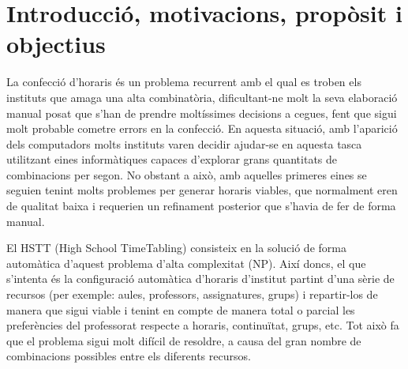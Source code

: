 \documentclass[11pt,a4paper,twoside]{report}
\begin{document}
  \begin{titlepage}
    
  \end{titlepage}


  \shipout\null
  \tableofcontents
  
  \chapter{Introducció, motivacions, propòsit i objectius}
  

  La confecció d'horaris és un problema recurrent amb el qual es troben els instituts que amaga una alta combinatòria, dificultant-ne molt la seva elaboració manual posat que s'han de prendre moltíssimes decisions a cegues,
  fent que sigui molt probable cometre errors en la confecció. En aquesta situació, amb l'aparició dels computadors molts instituts varen decidir ajudar-se en aquesta tasca utilitzant eines informàtiques capaces 
  d'explorar grans quantitats de combinacions per segon. No obstant a això, amb aquelles primeres eines se seguien tenint molts problemes per generar horaris viables, que normalment eren de qualitat baixa 
  i requerien un refinament posterior que s'havia de fer de forma manual.
  
  El HSTT (High School TimeTabling) consisteix en la solució de forma automàtica d'aquest problema d'alta complexitat (NP). 
  Així doncs, el que s'intenta és la configuració automàtica d'horaris d'institut partint d'una sèrie de recursos 
  (per exemple: aules, professors, assignatures, grups) i repartir-los de manera que sigui viable i tenint en compte 
  de manera total o parcial les preferències del professorat respecte a horaris, continuïtat, grups, etc. Tot això fa que el problema sigui molt difícil de resoldre, a causa del gran nombre de combinacions possibles entre els diferents recursos.
  
\end{document}
